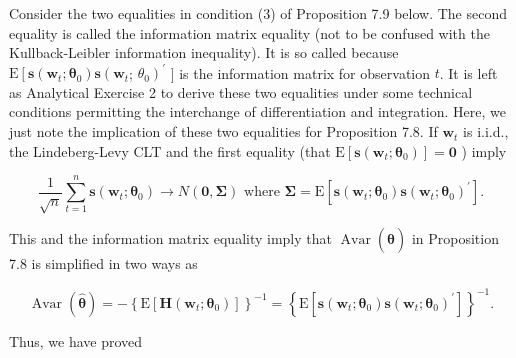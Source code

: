 \documentclass[10pt]{article}
\begin{document}
Consider the two equalities in condition (3) of Proposition 7.9 below. The second equality is called the information matrix equality (not to be confused with the Kullback-Leibler information inequality). It is so called because $\mathrm{E}\left[\mathbf{s}\left(\mathbf{w}_{t} ; \boldsymbol{\theta}_{0}\right) \mathbf{s}\left(\mathbf{w}_{t}\right.\right.$; $\left.\theta_{0}\right)^{\prime}$ ] is the information matrix for observation $t$. It is left as Analytical Exercise 2 to derive these two equalities under some technical conditions permitting the interchange of differentiation and integration. Here, we just note the implication of these two equalities for Proposition 7.8. If $\mathbf{w}_{t}$ is i.i.d., the Lindeberg-Levy CLT and the first equality (that $\mathrm{E}\left[\mathbf{s}\left(\mathbf{w}_{t} ; \boldsymbol{\theta}_{0}\right)\right]=\mathbf{0}$ ) imply


\begin{equation*}
\frac{1}{\sqrt{n}} \sum_{t=1}^{n} \mathbf{s}\left(\mathbf{w}_{t} ; \boldsymbol{\theta}_{0}\right) \rightarrow N(\mathbf{0}, \mathbf{\Sigma}) \text { where } \mathbf{\Sigma}=\mathrm{E}\left[\mathbf{s}\left(\mathbf{w}_{t} ; \boldsymbol{\theta}_{0}\right) \mathbf{s}\left(\mathbf{w}_{t} ; \boldsymbol{\theta}_{0}\right)^{\prime}\right] . \tag{7.3.12}
\end{equation*}


This and the information matrix equality imply that $\operatorname{Avar}(\hat{\boldsymbol{\theta}})$ in Proposition 7.8 is simplified in two ways as


\begin{equation*}
\operatorname{Avar}(\hat{\boldsymbol{\theta}})=-\left\{\mathrm{E}\left[\mathbf{H}\left(\mathbf{w}_{t} ; \boldsymbol{\theta}_{0}\right)\right]\right\}^{-1}=\left\{\mathrm{E}\left[\mathbf{s}\left(\mathbf{w}_{t} ; \boldsymbol{\theta}_{0}\right) \mathbf{s}\left(\mathbf{w}_{t} ; \boldsymbol{\theta}_{0}\right)^{\prime}\right]\right\}^{-1} . \tag{7.3.13}
\end{equation*}


Thus, we have proved
\end{document}
